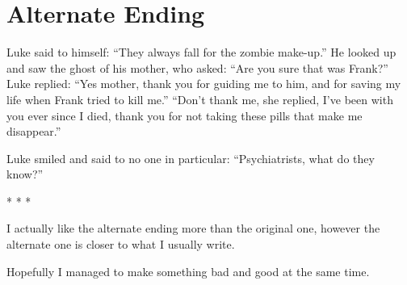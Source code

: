 \section*{Alternate Ending}

Luke said to himself: ``They always fall for the zombie
make-up.'' He looked up and saw the ghost of his mother, who
asked: ``Are you sure that was Frank?'' Luke replied:
``Yes mother, thank you for guiding me to him, and for saving
my life when Frank tried to kill me.'' ``Don't
thank me, she replied, I've been with you ever since I died,
thank you for not taking these pills that make me
disappear.''

Luke smiled and said to no one in particular: ``Psychiatrists,
what do they know?''

* * *


I actually like the alternate ending more than the original one,
however the alternate one is closer to what I usually write.



Hopefully I managed to make something bad and good at the same
time. 
 



